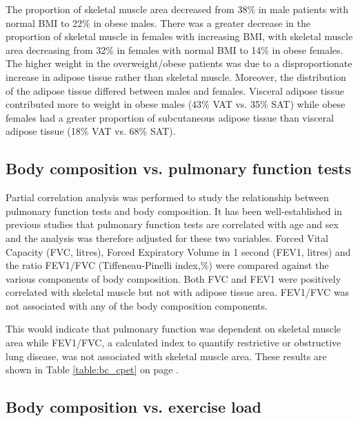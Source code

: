 The proportion of skeletal muscle area decreased from 38\% in male patients with normal BMI to 22\% in obese males. 
There was a greater decrease in the proportion of skeletal muscle in females with increasing BMI, with skeletal muscle area decreasing from 32\% in females with normal BMI to 14\% in obese females. 
The higher weight in the overweight/obese patients was due to a disproportionate increase in adipose tissue rather than skeletal muscle. 
Moreover, the distribution of the adipose tissue differed between males and females.
Visceral adipose tissue contributed more to weight in obese males (43\% VAT vs. 35\% SAT) while obese females had a greater proportion of subcutaneous adipose tissue than visceral adipose tissue (18\% VAT vs. 68\% SAT).

\subsection{Body composition vs. pulmonary function tests}

Partial correlation analysis was performed to study the relationship between pulmonary function tests and body composition. 
It has been well-established in previous studies that pulmonary function tests are correlated with age and sex and the analysis was therefore adjusted for these two variables. 
Forced Vital Capacity (FVC, litres), Forced Expiratory Volume in 1 second (FEV1, litres) and the ratio FEV1/FVC (Tiffeneau-Pinelli index,\%) were compared against the various components of body composition. 
Both FVC and FEV1 were positively correlated with skeletal muscle but not with adipose tissue area. 
FEV1/FVC was not associated with any of the body composition components. 

This would indicate that pulmonary function was dependent on skeletal muscle area while FEV1/FVC, a calculated index to quantify restrictive or obstructive lung disease, was not associated with skeletal muscle area. 
These results are shown in Table \ref{table:bc_cpet} on page \pageref{table:bc_cpet}.

\subsection{Body composition vs. exercise load}

